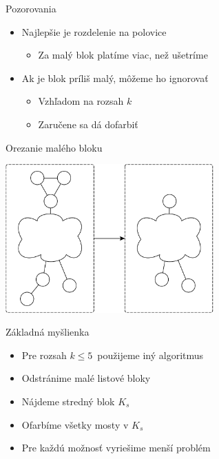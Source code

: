 \documentclass[slovak]{beamer}
\begin{document}
\begin{frame}{Pozorovania}
    \begin{itemize}
        \item Najlepšie je rozdelenie na polovice
        \begin{itemize}
            \item Za malý blok platíme viac, než ušetríme
        \end{itemize}
        \item Ak je blok príliš malý, môžeme ho ignorovať
        \begin{itemize}
            \item Vzhľadom na rozsah $k$
            \item Zaručene sa dá dofarbiť
        \end{itemize}
    \end{itemize}
\end{frame}

\begin{frame}{Orezanie malého bloku}
    \begin{center}
        \includegraphics[width=0.6\textwidth]{grafy/zanedbaj.pdf}
    \end{center}
\end{frame}

\begin{frame}{Základná myšlienka}
    \begin{itemize}
        \item Pre rozsah $k \leq 5$ použijeme iný algoritmus
        \item Odstránime malé listové bloky
        \item Nájdeme stredný blok $K_s$
        \item Ofarbíme všetky mosty v $K_s$
        \item Pre každú možnosť vyriešime menší problém
    \end{itemize}
\end{frame}
\end{document}

